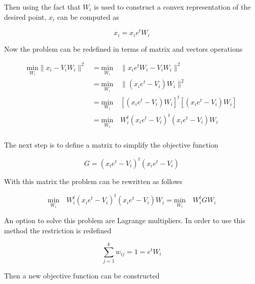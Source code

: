 \documentclass[12pt,journal]{IEEEtran}
\begin{document}
    Then using the fact that $W_i$ is used to construct a convex representation
    of the desired point, $x_i$ can be computed as

    \begin{equation*}
        x_i = x_i e^t W_i
    \end{equation*}

    Now the problem can be redefined in terms of matrix and vectors operations

    \begin{equation*}
        \begin{aligned}
            \underset{W_i}{\text{min}} \lVert x_i - V_i W_i \rVert^2
            &=
            \underset{W_i}{\text{min}} \quad \lVert x_i e^t W_i - V_i W_i \rVert^2\\
            &=
            \underset{W_i}{\text{min}} \quad \lVert (x_i e^t - V_i) W_i \rVert^2\\
            &=
            \underset{W_i}{\text{min}} \quad [(x_i e^t - V_i) W_i]^t [(x_i e^t - V_i) W_i]\\
            &=
            \underset{W_i}{\text{min}} \quad W_i^t(x_i e^t - V_i)^t (x_i e^t - V_i) W_i\\
        \end{aligned}
    \end{equation*}

    The next step is to define a matrix to simplify the objective function

    \begin{equation*}
        G = (x_i e^t - V_i)^t (x_i e^t - V_i)
    \end{equation*}

    With this matrix the problem can be rewritten as follows

    \begin{equation*}
            \underset{W_i}{\text{min}} \quad W_i^t(x_i e^t - V_i)^t (x_i e^t - V_i) W_i
            =
            \underset{W_i}{\text{min}} \quad W_i^t G W_i
    \end{equation*}

    An option to solve this problem are Lagrange multipliers. In order to use
    this method the restriction is redefined

    \begin{equation*}
        \sum_{j=1}^k w_{ij} = 1 = e^t W_i
    \end{equation*}

    Then a new objective function can be constructed
\end{document}
